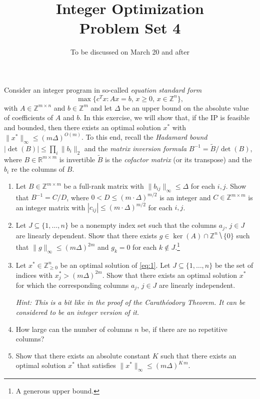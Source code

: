 \documentclass[11pt,a4paper]{article}
\title{Integer Optimization  \\ Problem Set 4 }
\date{To be discussed on March 20 and after}
\newcommand{\wt}[1]{\widetilde{#1}}
\begin{document}
\maketitle 

\noindent 
Consider an integer program in so-called \emph{equation standard form}
  \begin{equation}\label{eq:1}
    \max \{ c^T x : Ax = b, \, x≥0, \, x ∈ ℤ^n\}, 
  \end{equation}
  with $A ∈ℤ^{m ×n}$ and $b∈ℤ^m$ and let $Δ$ be an upper bound on the
  absolute value of coefficients of $A$ and $b$. In this exercise, we
  will show that, if the IP is feasible and bounded, then there exists
  an optimal solution $x^*$ with $\|x^*\|_∞ ≤ (m Δ)^{O(m)}$.  To this end,
  recall the \emph{Hadamard bound } $|\det(B)| ≤ ∏_i \|b_i\|_2$ and
  the \emph{matrix inversion formula} $B^{-1} = \wt{B} / \det(B)$,
  where $B ∈ℝ^{m × m}$ is invertible $\wt{B}$ is the \emph{cofactor
    matrix} (or its transpose) and the $b_i$ re the columns of $B$.

\begin{enumerate} 
\item Let $B ∈ℤ^{m × m}$ be a full-rank matrix with $\|b_{ij}\|_∞ ≤ Δ$
  for each $i,j$. Show that $B^{-1} = C / D$, where
  $0< D ≤ (m ⋅Δ)^{m/2}$ is an integer and $C ∈ ℤ^{m ×m}$ is an integer
  matrix with $|c_{ij}| ≤ (m ⋅Δ)^{m/2}$ for each $i,j$.
\item Let $J ⊆ \{1,\dots,n\}$ be a nonempty index set such that the
  columns $a_j, \, j ∈ J$ are linearly dependent. Show that there
  exists $g ∈ \ker(A) ∩ ℤ^n ⧹\{0\}$ such that
  $\|g\|_∞ ≤ (m Δ)^{2m}$
  and $g_k = 0$ for each $k ∉ J$.\footnote{A generous upper bound.} 
\item
  Let $x^* ∈ℤ^{n}_{≥0}$ be an optimal solution of \eqref{eq:1}. Let $J ⊆ \{1,\dots,n\}$ be the set of indices  with $x^*_j > (m Δ)^{2m}$. Show that there exists an optimal solution $x^*$ for which the corresponding columns $a_j, \, j ∈ J$ are linearly independent.

  \emph{Hint: This is a bit like in the proof of the Carathéodory Theorem. It can be considered to be an integer version of it. } 

\item  How large can the number of columns $n$ be, if there are no repetitive columns?
\item Show that there exists an absolute constant $K$ such that there exists an optimal solution $x^*$ that satisfies  $\|x^*\|_∞ ≤ (m Δ)^{K \, m}$. 
\end{enumerate}
\end{document}
